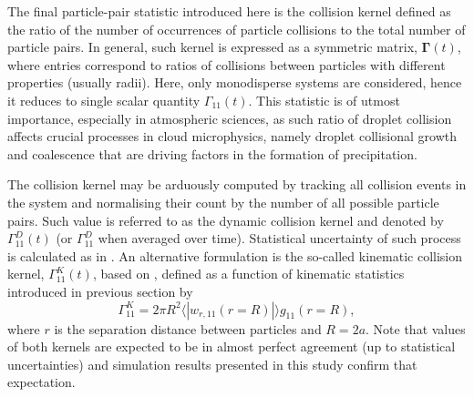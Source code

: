 \documentclass{pracamgren}
\begin{document}
The final particle-pair statistic introduced here is the collision kernel defined as the ratio of the number of occurrences of particle collisions to the total number of particle pairs.
In general, such kernel is expressed as a symmetric matrix, $\mathbf{\Gamma}(t)$, where entries correspond to ratios of collisions between particles with different properties (usually radii).
Here, only monodisperse systems are considered, hence it reduces to single scalar quantity $\Gamma_{11}(t)$.
This statistic is of utmost importance, especially in atmospheric sciences, as such ratio of droplet collision affects crucial processes in cloud microphysics, namely droplet collisional growth and coalescence that are driving factors in the formation of precipitation.   

The collision kernel may be arduously computed by tracking all collision events in the system and normalising their count by the number of all possible particle pairs.
Such value is referred to as the dynamic collision kernel and denoted by $\Gamma^D_{11}(t)$ (or $\Gamma^D_{11}$ when averaged over time).
Statistical uncertainty of such process is calculated as in \textcite[Equation 17 therein]{Rosa2013}.
An alternative formulation is the so-called kinematic collision kernel, $\Gamma^K_{11}(t)$, based on \textcite{Sundaram1997}, defined as a function of kinematic statistics introduced in previous section by
\begin{equation}
\Gamma^K_{11} = 2 \pi R^{2} \langle | w_{r, 11}(r = R) | \rangle g_{11}(r = R),
\label{eqn:gamma-k}
\end{equation}
where $r$ is the separation distance between particles and $R = 2a$.
Note that values of both kernels are expected to be in almost perfect agreement (up to statistical uncertainties) and simulation results presented in this study confirm that expectation.
\end{document}
